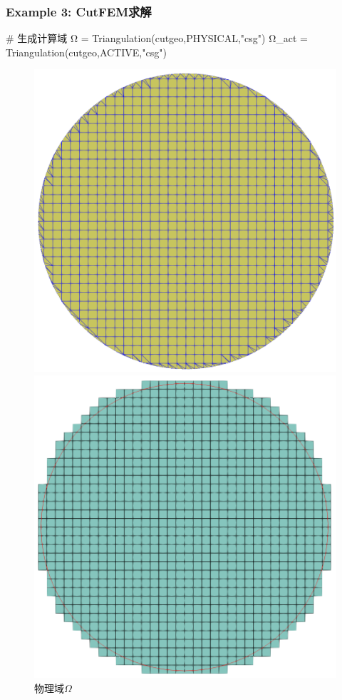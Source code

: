 \documentclass[lang=en,aspectratio=43,theme=default,logo=on]{simplebeamer}
\begin{document}
\begin{frame}[fragile]
    \frametitle{Example 3: CutFEM求解}
\begin{code}
# 生成计算域
Ω = Triangulation(cutgeo,PHYSICAL,"csg")
Ω_act = Triangulation(cutgeo,ACTIVE,"csg")
\end{code}
\begin{figure}
    \centering %
    \begin{minipage}[t]{0.5\linewidth}
        \centering
        \includegraphics[height=0.5\textheight]{./img/006.png}
        \caption{物理域$\Omega$}
    \end{minipage}%
    \begin{minipage}[t]{0.5\linewidth}
        \centering
        \includegraphics[height=0.5\textheight]{./img/007.png}

\end{minipage}
\end{figure}
\end{frame}
\end{document}
